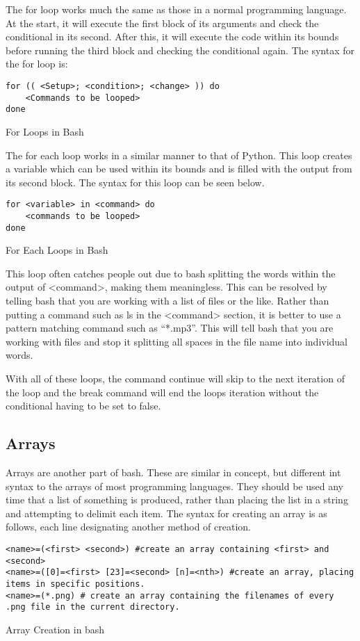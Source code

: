 			The for loop works much the same as those in a normal programming language.
			At the start, it will execute the first block of its arguments and check the conditional in its second.
			After this, it will execute the code within its bounds before running the third block and checking the conditional again.
			The syntax for the for loop is:
			\begin{code}
			\begin{verbatim}
for (( <Setup>; <condition>; <change> )) do
	<Commands to be looped>
done
			\end{verbatim}
			\label{code:ForLoopBash}
			\caption{For Loops in Bash}
			\end{code}
			The for each loop works in a similar manner to that of Python.
			This loop creates a variable which can be used within its bounds and is filled with the output from its second block.
			The syntax for this loop can be seen below.
			\begin{code}
			\begin{verbatim}
for <variable> in <command> do
	<commands to be looped>
done
			\end{verbatim}
			\label{code:ForEachBash}
			\caption{For Each Loops in Bash}
			\end{code}
			This loop often catches people out due to bash splitting the words within the output of <command>, making them meaningless.
			This can be resolved by telling bash that you are working with a list of files or the like.
			Rather than putting a command such as ls in the <command> section, it is better to use a pattern matching command such as ``*.mp3''.
			This will tell bash that you are working with files and stop it splitting all spaces in the file name into individual words.

			With all of these loops, the command continue will skip to the next iteration of the loop and the break command will end the loops iteration without the conditional having to be set to false.

		\subsection{Arrays}
			Arrays are another part of bash.
			These are similar in concept, but different int syntax to the arrays of most programming languages.
			They should be used any time that a list of something is produced, rather than placing the list in a string and attempting to delimit each item.
			The syntax for creating an array is as follows, each line designating another method of creation.
			\begin{code}
			\begin{verbatim}
<name>=(<first> <second>) #create an array containing <first> and <second>
<name>=([0]=<first> [23]=<second> [n]=<nth>) #create an array, placing items in specific positions.
<name>=(*.png) # create an array containing the filenames of every .png file in the current directory.
			\end{verbatim}
			\label{code:ArrayCreationBash}
			\caption{Array Creation in bash}
			\end{code}


